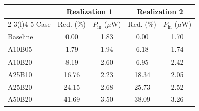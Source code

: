\begin{tabular*}{\linewidth}{@{\extracolsep{\fill}}lcccc@{}}\toprule
& \multicolumn{2}{c}{Realization 1} & \multicolumn{2}{c}{Realization 2}\\
\cmidrule(lr){2-3}\cmidrule(l){4-5}
Case & Red. (\%) & $\overline{P}_{\mathrm{in}}$ ($\mu$W) & Red. (\%) & $\overline{P}_{\mathrm{in}}$ ($\mu$W)\\\midrule
Baseline & 0.00 & 1.83 & 0.00 & 1.70 \\
A10B05 & 1.79 & 1.94 & 6.18 & 1.74 \\
A10B20 & 8.19 & 2.60 & 6.95 & 2.42 \\
A25B10 & 16.76 & 2.23 & 18.34 & 2.05 \\
A25B20 & 24.15 & 2.68 & 25.73 & 2.52 \\
A50B20 & 41.69 & 3.50 & 38.09 & 3.26 \\
\bottomrule
\end{tabular*}

